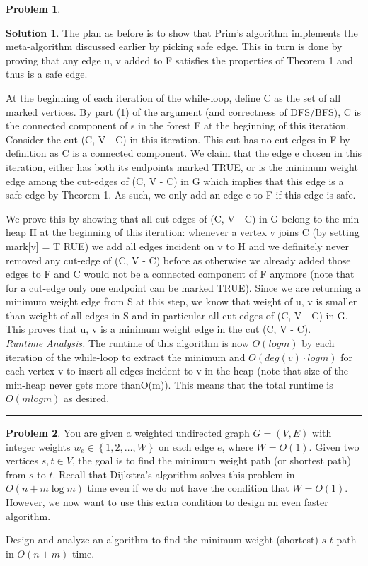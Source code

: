 \documentclass{article}
\theoremstyle{definition}
\newtheorem{problem}{Problem}
\def\fline{\rule{0.75\linewidth}{0.5pt}}
\newcommand{\finishline}{\begin{center}\fline\end{center}}
\newtheorem*{solution*}{Solution}
\newenvironment{solution}{\begin{solution*}}{{\finishline} \end{solution*}}
\newcommand{\set}[1]{\ensuremath{\left\{ #1 \right\}}}
\begin{document}
\begin{problem}
\begin{enumerate}
\begin{solution}
	The plan as before is to show that Prim’s algorithm implements the meta-algorithm discussed earlier by picking safe edge. This in turn is done by proving that any edge {u, v} added to F satisfies the properties of Theorem 1 and thus is a safe edge.

	At the beginning of each iteration of the while-loop, define C as the set of all marked vertices. By part (1) of the argument (and correctness of DFS/BFS), C is the connected component of s in the forest F at the beginning of this iteration. Consider the cut (C, V - C) in this iteration. This cut has no cut-edges in F by definition as C is a connected component. We claim that the edge e chosen in this iteration, either has both its endpoints marked TRUE, or is the minimum weight edge among the cut-edges of (C, V - C) in G which implies that this edge is a safe edge by Theorem 1. As such, we only add an edge e to F if this edge is safe.
	
We prove this by showing that all cut-edges of (C, V - C) in G belong to the min-heap H at the beginning of this iteration: whenever a vertex v joins C (by setting mark[v] = T RUE) we add all edges incident on v to H and we definitely never removed any cut-edge of (C, V - C) before as otherwise we already added those edges to F and C would not be a connected component of F anymore (note that for a cut-edge only one endpoint can be marked TRUE). Since we are returning a minimum weight edge from S at this step, we know that weight of {u, v} is smaller than weight of all edges in S and in particular all cut-edges of (C, V - C) in G. This proves that {u, v} is a minimum weight edge in the cut (C, V - C). \\
	
	\emph{Runtime Analysis.} The runtime of this algorithm is now $O(logm)$ by each iteration of the while-loop to extract the minimum and $O(deg(v)·logm)$ for each vertex v to insert all edges incident to v in the heap (note that size of the min-heap never gets more thanO(m)).  This means that the total runtime is $O(mlogm)$ as desired. \\



\end{solution}

	\end{enumerate}
	
\end{problem}

\medskip


\begin{problem}
	You are given a weighted undirected graph $G=(V,E)$ with integer weights $w_e \in \set{1,2,\ldots,W}$ on each edge $e$, where $W=O(1)$. 
	Given two vertices $s,t \in V$, the goal is to find the minimum weight path (or shortest path) from $s$ to $t$. Recall that Dijkstra's algorithm solves this problem in $O(n+m\log{m})$ time even if we do not have the condition that $W=O(1)$. 
	However, we now want to use this extra condition to design an even faster algorithm. 
	
	
	Design and analyze an algorithm to find the minimum weight (shortest) $s$-$t$ path in $O(n+m)$ time.
\end{problem}
\end{document}

